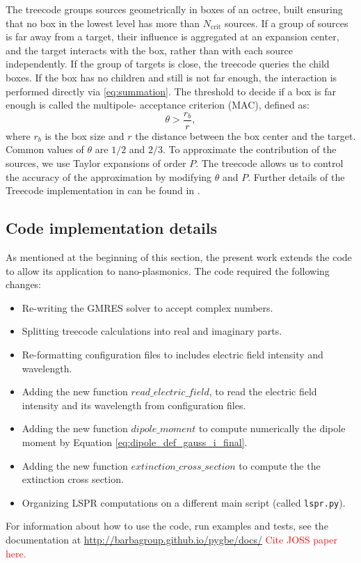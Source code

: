 The treecode groups sources geometrically in boxes of an octree, built ensuring
that no box in the lowest level has more than $N_\text{crit}$ sources. If a group of
sources is far away from a target, their influence is aggregated at an expansion center,
and the target interacts with the box, rather than with each source independently.
If the group of targets is  close, the treecode queries the child
boxes. If the box has no children and still is not far enough, the interaction is 
performed directly via \eqref{eq:summation}.
 The threshold to decide if a box is far enough is called the multipole-
acceptance criterion (MAC), defined as:
%
\begin{equation}
\theta > \frac{r_b}{r},
\end{equation}
%
\noindent where $r_b$ is the box size and $r$ the distance between the box center and the target.
Common values of $\theta$ are $1/2$ and $2/3$.
To approximate the contribution of the sources, we use Taylor expansions
of order $P$.
The treecode allows us to control the accuracy of the approximation by modifying $\theta$ and $P$.
Further details of the Treecode implementation in \pygbe can be found in \cite{CooperBarba-share154331,CooperBardhanBarba2013}.

\subsection{Code implementation details} \label{sec:code_imp}

As mentioned at the beginning of this section, the present work extends the \pygbe code
to allow its application to nano-plasmonics. 
The code required the following changes:

\begin{itemize}
    \item Re-writing the GMRES solver to accept complex numbers. 
    \item Splitting treecode calculations into real and imaginary parts.
    \item Re-formatting configuration files to includes electric field intensity and  wavelength.
    \item Adding the new function $read\_electric\_field$, to read the electric field intensity and its wavelength from configuration files.
    \item Adding the new function $dipole\_moment$ to compute numerically the dipole moment by Equation \eqref{eq:dipole_def_gauss_i_final}.
    \item Adding the new function $extinction\_cross\_section$ to compute the the extinction cross section.
    \item Organizing LSPR computations on a different main script (called \texttt{lspr.py}).
\end{itemize}

For information about how to use the code, run examples and tests, see the
\pygbe documentation at \url{http://barbagroup.github.io/pygbe/docs/}
\textcolor{red}{Cite JOSS paper here.}
